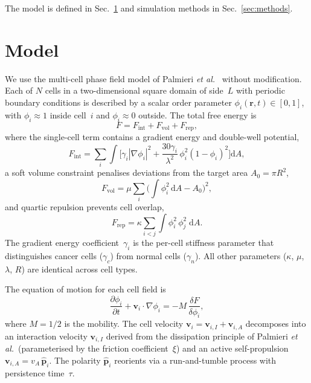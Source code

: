 \documentclass[aps,pre,twocolumn,superscriptaddress,longbibliography,floatfix]{revtex4-2}
\newcommand{\dd}{\mathrm{d}}               %
\newcommand{\vA}{v_{\!A}}                  %
\newcommand{\phii}{\phi_i}                 %
\newcommand{\phij}{\phi_j}                 %
\begin{document}
The model is defined in Sec.~\ref{sec:model} and simulation methods
in Sec.~\ref{sec:methods}.


\section{Model}
\label{sec:model}

We use the multi-cell phase field model of Palmieri
\textit{et al.}~\cite{Palmieri2015} without modification.  Each of
$N$ cells in a two-dimensional square domain of side~$L$ with periodic
boundary conditions is described by a scalar order parameter
$\phii(\bm{r},t) \in [0,1]$, with $\phii \approx 1$ inside cell~$i$
and $\phii \approx 0$ outside.  The total free energy is
%
\begin{equation}
  F = F_{\mathrm{int}} + F_{\mathrm{vol}} + F_{\mathrm{rep}},
  \label{eq:free-energy}
\end{equation}
%
where the single-cell term contains a gradient energy and double-well
potential,
%
\begin{equation}
  F_{\mathrm{int}} = \sum_i \int \biggl[
    \gamma_i |\nabla\phii|^2
    + \frac{30\gamma_i}{\lambda^2}\,\phii^2(1-\phii)^2
  \biggr] \dd A,
  \label{eq:F-int}
\end{equation}
%
a soft volume constraint penalises deviations from the target area
$A_0 = \pi R^2$,
%
\begin{equation}
  F_{\mathrm{vol}} = \mu \sum_i
    \biggl(\int \phii^2 \, \dd A - A_0\biggr)^{\!2},
  \label{eq:F-vol}
\end{equation}
%
and quartic repulsion prevents cell overlap,
%
\begin{equation}
  F_{\mathrm{rep}} = \kappa \sum_{i<j} \int \phii^2\,\phij^2 \; \dd A.
  \label{eq:F-rep}
\end{equation}
%
The gradient energy coefficient~$\gamma_i$ is the per-cell stiffness
parameter that distinguishes cancer cells ($\gamma_c$) from normal
cells ($\gamma_n$).  All other parameters ($\kappa$, $\mu$, $\lambda$,
$R$) are identical across cell types.

The equation of motion for each cell field
is~\cite{Palmieri2015}
%
\begin{equation}
  \frac{\partial \phii}{\partial t}
    + \bm{v}_i \cdot \nabla\phii
    = -M\,\frac{\delta F}{\delta \phii},
  \label{eq:eom}
\end{equation}
%
where $M = 1/2$ is the mobility.  The cell velocity
$\bm{v}_i = \bm{v}_{i,I} + \bm{v}_{i,A}$ decomposes into
an interaction velocity $\bm{v}_{i,I}$ derived from the
dissipation principle of Palmieri \textit{et al.}\ (parameterised by
the friction coefficient~$\xi$) and an active self-propulsion
$\bm{v}_{i,A} = \vA\,\hat{\bm{p}}_i$.  The polarity
$\hat{\bm{p}}_i$ reorients via a run-and-tumble process with
persistence time~$\tau$.
\end{document}
